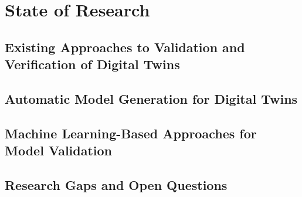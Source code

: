 \chapter{State of Research}
\label{chap:research}

\section{Existing Approaches to Validation and Verification of Digital Twins}

\section{Automatic Model Generation for Digital Twins}

\section{Machine Learning-Based Approaches for Model Validation}

\section{Research Gaps and Open Questions}
